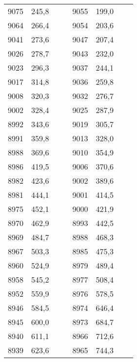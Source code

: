 \documentclass[11pt]{article}
\begin{document}
{{\begin{tabular}{|c|c|c|c|c|c|c|c|}
            \cline{1-2} \cline{5-6} 
            9075 & 245,8 &  &  & 9055 & 199,0 &  & \tabularnewline
            \cline{1-2} \cline{5-6} 
            9064 & 266,4 &  &  & 9054 & 203,6 &  & \tabularnewline
            \cline{1-2} \cline{5-6} 
            9041 & 273,6 &  &  & 9047 & 207,4 &  & \tabularnewline
            \cline{1-2} \cline{5-6} 
            9026 & 278,7 &  &  & 9043 & 232,0 &  & \tabularnewline
            \cline{1-2} \cline{5-6} 
            9023 & 296,3 &  &  & 9037 & 244,1 &  & \tabularnewline
            \cline{1-2} \cline{5-6} 
            9017 & 314,8 &  &  & 9036 & 259,8 &  & \tabularnewline
            \cline{1-2} \cline{5-6} 
            9008 & 320,3 &  &  & 9032 & 276,7 &  & \tabularnewline
            \cline{1-2} \cline{5-6} 
            9002 & 328,4 &  &  & 9025 & 287,9 &  & \tabularnewline
            \cline{1-2} \cline{5-6} 
            8992 & 343,6 &  &  & 9019 & 305,7 &  & \tabularnewline
            \cline{1-2} \cline{5-6} 
            8991 & 359,8 &  &  & 9013 & 328,0 &  & \tabularnewline
            \cline{1-2} \cline{5-6} 
            8988 & 369,6 &  &  & 9010 & 354,9 &  & \tabularnewline
            \cline{1-2} \cline{5-6} 
            8986 & 419,5 &  &  & 9006 & 370,6 &  & \tabularnewline
            \cline{1-2} \cline{5-6} 
            8982 & 423,6 &  &  & 9002 & 389,6 &  & \tabularnewline
            \cline{1-2} \cline{5-6} 
            8981 & 444,1 &  &  & 9001 & 414,5 &  & \tabularnewline
            \cline{1-2} \cline{5-6} 
            8975 & 452,1 &  &  & 9000 & 421,9 &  & \tabularnewline
            \cline{1-2} \cline{5-6} 
            8970 & 462,9 &  &  & 8993 & 442,5 &  & \tabularnewline
            \cline{1-2} \cline{5-6} 
            8969 & 484,7 &  &  & 8988 & 468,3 &  & \tabularnewline
            \cline{1-2} \cline{5-6} 
            8967 & 503,3 &  &  & 8985 & 475,3 &  & \tabularnewline
            \cline{1-2} \cline{5-6} 
            8960 & 524,9 &  &  & 8979 & 489,4 &  & \tabularnewline
            \cline{1-2} \cline{5-6} 
            8958 & 545,2 &  &  & 8977 & 508,4 &  & \tabularnewline
            \cline{1-2} \cline{5-6} 
            8952 & 559,9 &  &  & 8976 & 578,5 &  & \tabularnewline
            \cline{1-2} \cline{5-6} 
            8946 & 584,5 &  &  & 8974 & 646,4 &  & \tabularnewline
            \cline{1-2} \cline{5-6} 
            8945 & 600,0 &  &  & 8973 & 684,7 &  & \tabularnewline
            \cline{1-2} \cline{5-6} 
            8940 & 611,1 &  &  & 8966 & 712,6 &  & \tabularnewline
            \cline{1-2} \cline{5-6} 
            8939 & 623,6 &  &  & 8965 & 744,3 &  & \tabularnewline

\end{tabular}}}
\end{document}
